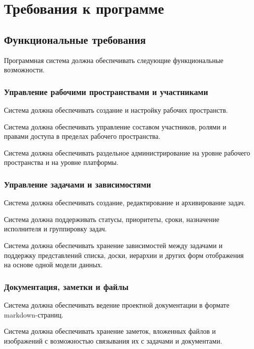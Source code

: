 \section{Требования к программе}

\subsection{Функциональные требования}

\headingtextsep

Программная система должна обеспечивать следующие функциональные возможности.

\subsubsection{Управление рабочими пространствами и участниками}

Система должна обеспечивать создание и настройку рабочих пространств.

Система должна обеспечивать управление составом участников, ролями и правами доступа в пределах рабочего пространства.

Система должна обеспечивать раздельное администрирование на уровне рабочего пространства и на уровне платформы.

\subsubsection{Управление задачами и зависимостями}

Система должна обеспечивать создание, редактирование и архивирование задач.

Система должна поддерживать статусы, приоритеты, сроки, назначение исполнителя и группировку задач.

Система должна обеспечивать хранение зависимостей между задачами и поддержку представлений списка, доски, иерархии и других форм отображения на основе одной модели данных.

\subsubsection{Документация, заметки и файлы}

Система должна обеспечивать ведение проектной документации в формате markdown-страниц.

Система должна обеспечивать хранение заметок, вложенных файлов и изображений с возможностью связывания их с задачами и документами.

